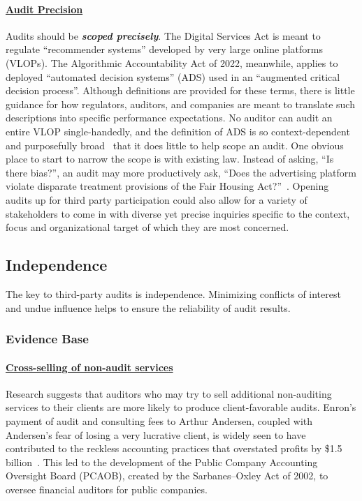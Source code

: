 \documentclass[sigconf]{acmart}
\begin{document}
\paragraph{\underline{Audit Precision}} Audits should be \textbf{\textit{scoped precisely}}. The Digital Services Act is meant to regulate “recommender systems” developed by very large online platforms (VLOPs). The Algorithmic Accountability Act of 2022, meanwhile, applies to deployed “automated decision systems” (ADS) used in an “augmented critical decision process”. Although definitions are provided for these terms, there is little guidance for how regulators, auditors, and companies are meant to translate such descriptions into specific performance expectations. No auditor can audit an entire VLOP single-handedly, and the definition of ADS is so context-dependent and purposefully broad~\cite{richardson2021defining} that it does little to help scope an audit. One obvious place to start to narrow the scope is with existing law. Instead of asking, “Is there bias?”, an audit may more productively ask, “Does the advertising platform violate disparate treatment provisions of the Fair Housing Act?”~\cite{tobin2019hud}. Opening audits up for third party participation could also allow for a variety of stakeholders to come in with diverse yet precise inquiries specific to the context, focus and organizational target of which they are most concerned.

\subsection{Independence} 

The key to third-party audits is independence. Minimizing conflicts of interest and undue influence helps to ensure the reliability of audit results.

\subsubsection{Evidence Base}

\paragraph{\underline{Cross-selling of non-audit services}} Research suggests that auditors who may try to sell additional non-auditing services to their clients are more likely to produce client-favorable audits. Enron’s payment of audit and consulting fees to Arthur Andersen, coupled with Andersen’s fear of losing a very lucrative client, is widely seen to have contributed to the reckless accounting practices that overstated profits by \$1.5 billion~\cite{healy2003fall,mccoy2002realigning}. This 
led to the development of the Public Company Accounting Oversight Board (PCAOB), created by the Sarbanes–Oxley Act of 2002, to oversee financial auditors for public companies.
\end{document}

